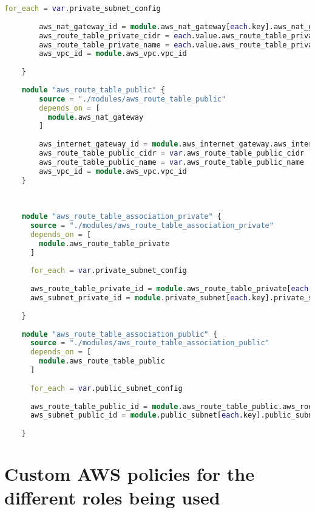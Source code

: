 \begin{lstlisting}[language=terraform]
        for_each = var.private_subnet_config
    
        aws_nat_gateway_id = module.aws_nat_gateway[each.key].aws_nat_gateway_id
        aws_route_table_private_cidr = each.value.aws_route_table_private_cidr
        aws_route_table_private_name = each.value.aws_route_table_private_name
        aws_vpc_id = module.aws_vpc.vpc_id
      
    }
    
    module "aws_route_table_public" {
        source = "./modules/aws_route_table_public"
        depends_on = [
          module.aws_nat_gateway
        ]
    
        aws_internet_gateway_id = module.aws_internet_gateway.aws_internet_gateway_id
        aws_route_table_public_cidr = var.aws_route_table_public_cidr
        aws_route_table_public_name = var.aws_route_table_public_name
        aws_vpc_id = module.aws_vpc.vpc_id
    }
    
    
    
    module "aws_route_table_association_private" {
      source = "./modules/aws_route_table_association_private"
      depends_on = [
        module.aws_route_table_private
      ]
    
      for_each = var.private_subnet_config
    
      aws_route_table_private_id = module.aws_route_table_private[each.key].aws_route_table_private_id
      aws_subnet_private_id = module.private_subnet[each.key].private_subnet_id
    
    }
    
    module "aws_route_table_association_public" {
      source = "./modules/aws_route_table_association_public"
      depends_on = [
        module.aws_route_table_public
      ]
    
      for_each = var.public_subnet_config
    
      aws_route_table_public_id = module.aws_route_table_public.aws_route_table_public_id
      aws_subnet_public_id = module.public_subnet[each.key].public_subnet_id
      
    }
\end{lstlisting}

\section{
{Custom AWS policies for the different roles being used}}
\label{sec:Custom AWS policies voor de verschillende rollen die gebruikt worden}

